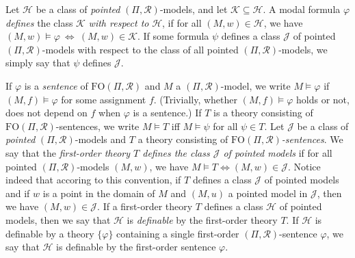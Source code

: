 \documentclass[copyright,creativecommons]{eptcs}
\begin{document}
Let $\mathcal{H}$ be a class of \emph{pointed} $(\Pi,\mathcal{R})$-models, and let $\mathcal{K}\subseteq\mathcal{H}$.
A modal formula $\varphi$ \emph{defines} the class $\mathcal{K}$ \emph{with respect to} $\mathcal{H}$, if
for all $(M,w)\in\mathcal{H}$, we have $(M,w)\models\varphi\ \Leftrightarrow\ (M,w)\in\mathcal{K}$.
If some formula $\psi$ defines a class $\mathcal{J}$ of pointed $(\Pi,\mathcal{R})$-models with respect to the
class of all pointed $(\Pi,\mathcal{R})$-models, we simply say that $\psi$ defines $\mathcal{J}$.




If $\varphi$ is a \emph{sentence} of $\mathrm{FO}(\Pi,\mathcal{R})$ 
and $M$ a $(\Pi,\mathcal{R})$-model,
we write $M\models\varphi$ if $(M,f)\models\varphi$
for some assignment $f$. (Trivially, whether $(M,f)\models\varphi$ holds or not, does not
depend on $f$ when $\varphi$ is a sentence.)
If $T$ is a theory consisting of $\mathrm{FO}(\Pi,\mathcal{R})$-sentences,
we write $M\models T$ iff $M\models\psi$ for all $\psi\in T$.
Let $\mathcal{J}$ be a class of \emph{pointed} $(\Pi,\mathcal{R})$-models
and $T$ a theory consisting of \emph{$\mathrm{FO}(\Pi,\mathcal{R})$-sentences}.
We say that the \emph{first-order theory $T$ defines the class $\mathcal{J}$
of pointed models} if for all pointed $(\Pi,\mathcal{R})$-models $(M,w)$, we have
$M\models T\Leftrightarrow (M,w)\in\mathcal{J}$.
Notice indeed that accoring to this convention, if $T$
defines a class $\mathcal{J}$ of pointed models
and if $w$ is a point in
the domain of $M$ and $(M,u)$ a pointed model in $\mathcal{J}$, then
we have $(M,w)\in\mathcal{J}$.
If a first-order theory $T$ defines a class $\mathcal{H}$ of pointed models,
then we say that $\mathcal{H}$ is \emph{definable} by
the first-order theory $T$.
If $\mathcal{H}$ is definable by a theory $\{\varphi\}$ containing a
single first-order $(\Pi,\mathcal{R})$-sentence $\varphi$, we say that $\mathcal{H}$
is definable by the first-order sentence $\varphi$.
\end{document}
